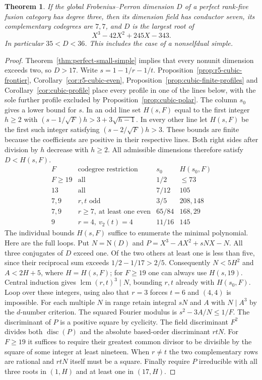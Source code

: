\documentclass[11pt,a4paper]{article}
\newtheorem{theorem}{Theorem}[section]
\numberwithin{equation}{section}
\begin{document}
\begin{theorem}\label{thm:cubic-intrinsic}
If the global Frobenius--Perron dimension $D$ of a perfect rank-five fusion category has degree three, then its dimension field has conductor seven, its complementary codegrees are $7,7$, and $D$ is the largest root of
\[
                X^3-42X^2+245X-343 .
\]
In particular $35<D<36$. This includes the case of a nonselfdual simple.
\end{theorem}
\begin{proof}
Theorem~\ref{thm:perfect-small-simple} implies that every nonunit dimension exceeds two, so $D>17$. Write $s=1-1/r-1/t$. Proposition~\ref{prop:r5-cubic-frontier}, Corollary~\ref{cor:r5-cubic-even}, Proposition~\ref{prop:cubic-finite-profiles} and Corollary~\ref{cor:cubic-profile} place every profile in one of the lines below, with the sole further profile excluded by Proposition~\ref{prop:cubic-polar}. The column $s_0$ gives a lower bound for $s$. In an odd line set $H(s,F)$ equal to the first integer $h\ge2$ with $(s-1/\sqrt F)h>3+3\sqrt{h-1}$. In every other line let $H(s,F)$ be the first such integer satisfying $(s-2/\sqrt F)h>3$. These bounds are finite because the coefficients are positive in their respective lines. Both right sides after division by $h$ decrease with $h\ge2$. All admissible dimensions therefore satisfy $D<H(s,F)$.
\[
\begin{array}{c|c|c|c}
 F & \text{codegree restriction}&s_0&H(s_0,F)\\\hline
 F\ge19 & \text{all}&1/2&\le73\\
 13 & \text{all}&7/12&105\\
 7,9&r,t\text{ odd}&3/5&208,148\\
 7,9&r\ge7,\ \text{at least one even}&65/84&168,29\\
 9&r=4,\ v_2(t)=4&11/16&145
\end{array}
\]
The individual bounds $H(s,F)$ suffice to enumerate the minimal polynomial. Here are the full loops. Put $N=\mathrm N(D)$ and $P=X^3-AX^2+sNX-N$. All three conjugates of $D$ exceed one. Of the two others at least one is less than five, since their reciprocal sum exceeds $1/2-1/17>2/5$. Consequently $N<5H^2$ and $A<2H+5$, where $H=H(s,F)$; for $F\ge19$ one can always use $H(s,19)$. Central induction gives $\operatorname{lcm}(r,t)^3\mid N$, bounding $r,t$ already with $H(s_0,F)$. Loop over these integers, using also that $r=3$ forces $t=6$ and $(4,4)$ is impossible. For each multiple $N$ in range retain integral $sN$ and $A$ with $N\mid A^3$ by the $d$-number criterion. The squared Fourier modulus is $s^2-3A/N\le1/F$. The discriminant of $P$ is a positive square by cyclicity. The field discriminant $F^2$ divides both $\operatorname{disc}(P)$ and the absolute based-order discriminant $rtN$. For $F\ge19$ it suffices to require their greatest common divisor to be divisible by the square of some integer at least nineteen. When $r\ne t$ the two complementary rows are rational and $rtN$ itself must be a square. Finally require $P$ irreducible with all three roots in $(1,H)$ and at least one in $(17,H)$.


\end{proof}
\end{document}
